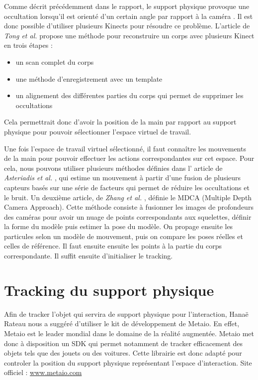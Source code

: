 Comme décrit précédemment dans le rapport, le support physique provoque une occultation lorsqu’il est orienté d’un certain angle par rapport à la caméra . Il est donc possible d’utiliser plusieurs Kinects pour résoudre ce problème. L’article de \textit{Tong et al.} \cite{6165146} propose une méthode pour reconstruire un corps avec plusieurs Kinect en trois étapes :

\begin{itemize}
	\item un scan complet du corps
	\item une méthode d’enregistrement avec un template
	\item un alignement des différentes parties du corps qui permet de supprimer les occultations
\end{itemize}

Cela permettrait donc d’avoir la position de la main par rapport au support physique pour pouvoir sélectionner l’espace virtuel de travail.

Une fois l’espace de travail virtuel sélectionné, il faut connaître les mouvements de la main pour pouvoir effectuer les actions correspondantes sur cet espace. Pour cela, nous pouvons utiliser plusieurs méthodes définies dans l’ article de \textit{Asteriadis et al.} \cite{Asteriadis:2013:EHM:2466715.2466727}, qui estime un mouvement à partir d’une fusion de plusieurs capteurs basés sur une série de facteurs qui permet de réduire les occultations et le bruit. Un deuxième article, de \textit{Zhang et al.} \cite{6385968}, définie le MDCA (Multiple Depth Camera Approach). Cette méthode consiste à fusionner les images de profondeurs des caméras pour avoir un nuage de points correspondants aux squelettes, définir la forme du modèle puis estimer la pose du modèle. On propage ensuite les particules selon un modèle de mouvement,  puis on compare les poses réelles et celles de référence. Il faut ensuite ensuite les points à la partie du corps correspondante. Il suffit ensuite d’initialiser le tracking.

\section{Tracking du support physique}

Afin de tracker l’objet qui servira de support physique pour l’interaction, Hanaë Rateau nous a suggéré d’utiliser le kit de développement de Metaio. En effet, Metaio est le leader mondial dans le domaine de la réalité augmentée. Metaio met donc à disposition un SDK qui permet notamment de tracker efficacement des objets tels que des jouets ou des voitures. Cette librairie est donc adapté pour controler la position du support physique représentant l’espace d’interaction. Site officiel : \hyperref[http://www.metaio.com]{www.metaio.com}
